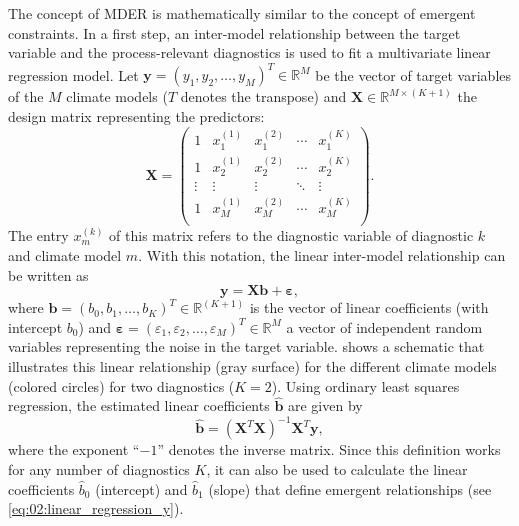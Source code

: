 The concept of \ac{MDER} is mathematically similar to the concept of emergent
constraints. In a first step, an inter-model relationship between the target
variable and the process-relevant diagnostics is used to fit a multivariate
linear regression model. Let $\bm{y} = \left( y_1, y_2, \ldots, y_M \right)^T
\in \mathbb{R}^M$ be the vector of target variables of the $M$ climate models
($T$ denotes the transpose) and $\bm{X} \in \mathbb{R}^{M \times (K + 1)}$ the
design matrix representing the predictors:
\begin{equation}
  \bm{X} =
  \begin{pmatrix}
    1 & x_1^{(1)} & x_1^{(2)} & \cdots & x_1^{(K)} \\
    1 & x_2^{(1)} & x_2^{(2)} & \cdots & x_2^{(K)} \\
    \vdots & \vdots & \vdots & \ddots & \vdots \\
    1 & x_M^{(1)} & x_M^{(2)} & \cdots & x_M^{(K)} \\
  \end{pmatrix}.
  \label{eq:02:design_matrix}
\end{equation}
The entry $x_m^{(k)}$ of this matrix refers to the diagnostic variable of
diagnostic $k$ and climate model $m$. With this notation, the linear
inter-model relationship can be written as
\begin{equation}
  \bm{y} = \bm{X} \bm{b} + \bm{\varepsilon},
  \label{eq:02:multivariate_linear_model}
\end{equation}
where $\bm{b} = \left( b_0, b_1, \ldots, b_K \right)^T \in \mathbb{R}^{(K +
  1)}$ is the vector of linear coefficients (with intercept $b_0$) and
$\bm{\varepsilon} = \left( \varepsilon_1, \varepsilon_2, \ldots, \varepsilon_M
\right)^T \in \mathbb{R}^M$ a vector of independent random variables
representing the noise in the target variable.  shows a
schematic that illustrates this linear relationship (gray surface) for the
different climate models (colored circles) for two diagnostics ($K = 2$). Using
ordinary least squares regression, the estimated linear coefficients
$\hat{\bm{b}}$ are given by
\begin{equation}
  \hat{\bm{b}} = \left( \bm{X}^T \bm{X} \right)^{-1} \bm{X}^T \bm{y},
  \label{eq:02:linear_coefficients}
\end{equation}
where the exponent \enquote{$-1$} denotes the inverse matrix. Since this
definition works for any number of diagnostics $K$, it can also be used to
calculate the linear coefficients $\hat{b}_0$ (intercept) and $\hat{b}_1$
(slope) that define emergent relationships (see
\cref{eq:02:linear_regression_y}).

